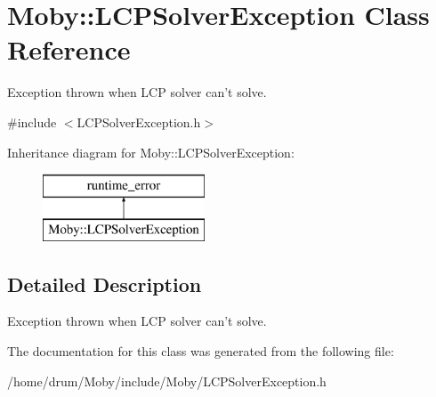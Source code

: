 \section{Moby\-:\-:L\-C\-P\-Solver\-Exception Class Reference}
\label{classMoby_1_1LCPSolverException}


Exception thrown when L\-C\-P solver can't solve.  




{\ttfamily \#include $<$L\-C\-P\-Solver\-Exception.\-h$>$}

Inheritance diagram for Moby\-:\-:L\-C\-P\-Solver\-Exception\-:\begin{figure}[H]
\begin{center}
\leavevmode
\includegraphics[height=2.000000cm]{classMoby_1_1LCPSolverException}
\end{center}
\end{figure}


\subsection{Detailed Description}
Exception thrown when L\-C\-P solver can't solve. 

The documentation for this class was generated from the following file\-:\begin{DoxyCompactItemize}
\item 
/home/drum/\-Moby/include/\-Moby/L\-C\-P\-Solver\-Exception.\-h\end{DoxyCompactItemize}
